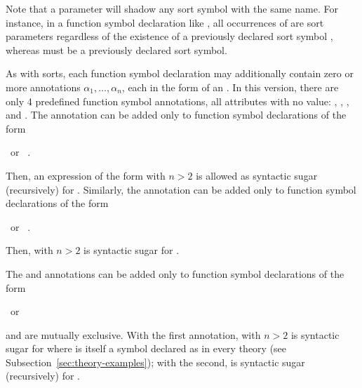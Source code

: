 \begin{newver}
Note that a parameter will shadow any sort symbol with the same name.
For instance, in a function symbol declaration like
,
all occurrences of  are sort parameters regardless of the existence
of a previously declared sort symbol , whereas  must
be a previously declared sort symbol.
\end{newver}

As with sorts, each function symbol declaration 
may additionally contain zero or more annotations $\alpha_1, \ldots, \alpha_n$,
each in the form of an .
In this version, there are only 4 predefined function symbol annotations,
all attributes with no value:
, 
,
,
and
. 
The  annotation can be added only 
to function symbol declarations of the form
\begin{center}
\ or \ 
.
\end{center}
Then, an expression of the form  
with $n > 2$ is allowed as syntactic sugar (recursively) for
.
Similarly,
the  annotation can be added only 
to function symbol declarations of the form
\begin{center}
\ or \ 
.
\end{center}
Then, \expr{($f$ $t_1\ \cdots\ t_n$)} with $n > 2$ is syntactic sugar for
.

The  and  annotations can be added only 
to function symbol declarations of the form
\begin{center}
\ or \ 
\end{center}
and are mutually exclusive.
With the first annotation, 
 with $n > 2$ is syntactic sugar for
where \ter{and} is itself a symbol declared as 
in every theory (see Subsection~\ref{sec:theory-examples});
with the second, \expr{($f$ $t_1\ \cdots\ t_n$)} is syntactic sugar 
(recursively) for
. 
\medskip


